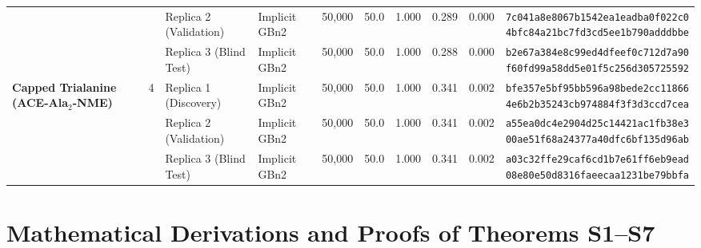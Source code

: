 \documentclass[10pt,letterpaper]{article}
\begin{document}
{\begin{longtable}{@{}l c l l r r c c c l@{}}
 &  & Replica 2 (Validation) & Implicit GBn2 & 50,000 & 50.0 & 1.000 & 0.289 & 0.000 & \shortstack[l]{\texttt{7c041a8e8067b1542ea1eadba0f022c0}\\\texttt{4bfc84a21bc7fd3cd5ee1b790adddbbe}} \\

 &  & Replica 3 (Blind Test) & Implicit GBn2 & 50,000 & 50.0 & 1.000 & 0.288 & 0.000 & \shortstack[l]{\texttt{b2e67a384e8c99ed4dfeef0c712d7a90}\\\texttt{f60fd99a58dd5e01f5c256d305725592}} \\
\midrule[0.35pt]
\textbf{Capped Trialanine (ACE-Ala$_2$-NME)} & 4 & Replica 1 (Discovery) & Implicit GBn2 & 50,000 & 50.0 & 1.000 & 0.341 & 0.002 & \shortstack[l]{\texttt{bfe357e5bf95bb596a98bede2cc11866}\\\texttt{4e6b2b35243cb974884f3f3d3ccd7cea}} \\

 &  & Replica 2 (Validation) & Implicit GBn2 & 50,000 & 50.0 & 1.000 & 0.341 & 0.002 & \shortstack[l]{\texttt{a55ea0dc4e2904d25c14421ac1fb38e3}\\\texttt{00ae51f68a24377a40dfc6bf135d96ab}} \\

 &  & Replica 3 (Blind Test) & Implicit GBn2 & 50,000 & 50.0 & 1.000 & 0.341 & 0.002 & \shortstack[l]{\texttt{a03c32ffe29caf6cd1b7e61ff6eb9ead}\\\texttt{08e80e50d8316faeecaa1231be79bbfa}} \\

\end{longtable}
}

\clearpage
\section{Mathematical Derivations and Proofs of Theorems S1--S7}
\end{document}
